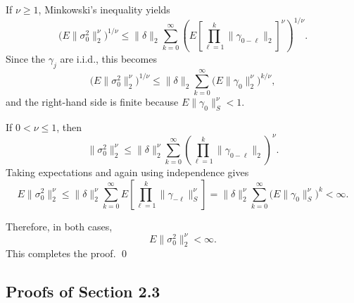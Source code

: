 \documentclass[12pt,a4paper]{article}
\theoremstyle{definition}
\begin{document}
If \(\nu\ge 1\), Minkowski's inequality yields
\[
\bigl(E\|\sigma_0^2\|_2^\nu\bigr)^{1/\nu}
\le
\|\delta\|_2
\sum_{k=0}^\infty
\left(
E\left[
\prod_{\ell=1}^k \|\gamma_{0-\ell}\|_2
\right]^\nu
\right)^{1/\nu}.
\]
Since the \(\gamma_j\) are i.i.d., this becomes
\[
\bigl(E\|\sigma_0^2\|_2^\nu\bigr)^{1/\nu}
\le
\|\delta\|_2
\sum_{k=0}^\infty
\bigl(E\|\gamma_0\|_2^\nu\bigr)^{k/\nu},
\]
and the right-hand side is finite because \(E\|\gamma_0\|_S^\nu<1\).

If \(0<\nu\le 1\), then
\[
\|\sigma_0^2\|_2^\nu
\le
\|\delta\|_2^\nu
\sum_{k=0}^\infty
\left(
\prod_{\ell=1}^k \|\gamma_{0-\ell}\|_2
\right)^\nu.
\]
Taking expectations and again using independence gives
\[
E\|\sigma_0^2\|_2^\nu
\le
\|\delta\|_2^\nu
\sum_{k=0}^\infty
E\left[
\prod_{\ell=1}^k \|\gamma_{-\ell}\|_S^\nu
\right]
=
\|\delta\|_2^\nu
\sum_{k=0}^\infty
\bigl(E\|\gamma_0\|_S^\nu\bigr)^k
<\infty.
\]

Therefore, in both cases,
\[
E\|\sigma_0^2\|_2^\nu<\infty.
\]
This completes the proof. \qed
\subsection{Proofs of Section 2.3}
\label{subsec:ProofAsymptoticNormality}
\end{document}
